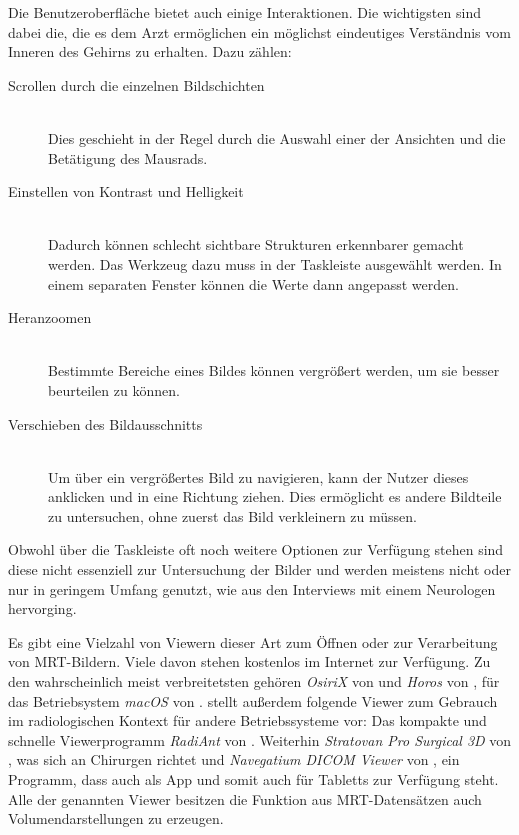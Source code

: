 Die Benutzeroberfläche bietet auch einige Interaktionen. Die wichtigsten sind dabei die, die es dem Arzt ermöglichen ein möglichst eindeutiges Verständnis vom Inneren des Gehirns zu erhalten.  Dazu zählen:

\begin{description}
\item [Scrollen durch die einzelnen Bildschichten]\hfill \\
Dies geschieht in der Regel durch die Auswahl einer der Ansichten und die Betätigung des Mausrads. 
\item [Einstellen von Kontrast und Helligkeit]\hfill \\
Dadurch können schlecht sichtbare Strukturen erkennbarer gemacht werden. Das Werkzeug dazu muss in der Taskleiste ausgewählt werden. In einem separaten Fenster können die Werte dann angepasst werden. 
\item [Heranzoomen]\hfill \\
Bestimmte Bereiche eines Bildes können vergrößert werden, um sie besser beurteilen zu können.
\item [Verschieben des Bildausschnitts]\hfill \\
Um über ein vergrößertes Bild zu navigieren, kann der Nutzer dieses anklicken und in eine Richtung ziehen. Dies ermöglicht es andere Bildteile zu untersuchen, ohne zuerst das Bild verkleinern zu müssen.
\end{description}

Obwohl über die Taskleiste oft noch weitere Optionen zur Verfügung stehen sind diese nicht essenziell zur Untersuchung der Bilder und werden meistens nicht oder nur in geringem Umfang genutzt, wie aus den Interviews mit einem Neurologen hervorging.

Es gibt eine Vielzahl von Viewern dieser Art zum Öffnen oder zur Verarbeitung von MRT-Bildern. Viele davon stehen kostenlos im Internet zur Verfügung. 
Zu den wahrscheinlich meist verbreitetsten gehören \textit{OsiriX} von \cite{osirix} und \textit{Horos} von \cite{horos}, für das Betriebsystem \textit{macOS} von \cite{macOs}. \cite{radiocafe} stellt außerdem folgende Viewer zum Gebrauch im radiologischen Kontext für andere Betriebssysteme vor: Das kompakte und schnelle Viewerprogramm \textit{RadiAnt} von \cite{radiant}. Weiterhin \textit{Stratovan Pro Surgical 3D} von \cite{prosurgical}, was sich an Chirurgen richtet und \textit{Navegatium DICOM Viewer} von \cite{navegatium}, ein Programm, dass auch als App und somit auch für Tabletts zur Verfügung steht.
Alle der genannten Viewer besitzen die Funktion aus MRT-Datensätzen auch Volumendarstellungen zu erzeugen.

